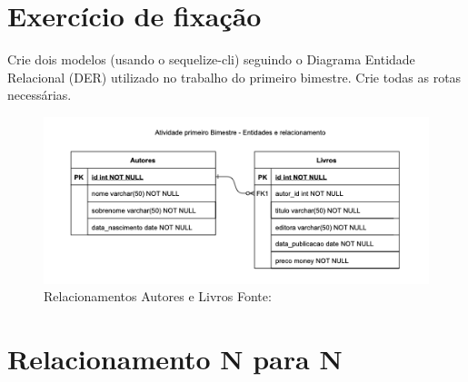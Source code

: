 \section{Exercício de fixação}

Crie dois modelos (usando o sequelize-cli) seguindo o Diagrama Entidade Relacional (DER) utilizado no trabalho do primeiro bimestre. Crie todas as rotas necessárias.

\begin{figure}[H]
	\centering
	\includegraphics[scale=0.7]{imagens/der.png}
	\caption{
		Relacionamentos Autores e Livros
		Fonte: \cite{O Autor}
	}
	\label{fig:der}
\end{figure}

\section{Relacionamento N para N}